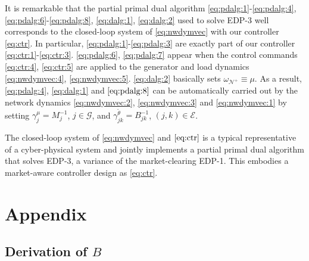 \documentclass[journal,12pt,onecolumn,draftclsnofoot]{IEEEtran}
\begin{document}
It is remarkable that the partial primal dual algorithm \eqref{eq:pdalg:1}-\eqref{eq:pdalg:4}, \eqref{eq:pdalg:6}-\eqref{eq:pdalg:8}, \eqref{eq:dalg:1}, \eqref{eq:dalg:2} used to solve EDP-3 well corresponds to the closed-loop system of \eqref{eq:nwdymvec} with our controller \eqref{eq:ctr}. In particular, \eqref{eq:pdalg:1}-\eqref{eq:pdalg:3} are exactly part of our controller \eqref{eq:ctr:1}-\eqref{eq:ctr:3}. \eqref{eq:pdalg:6}, \eqref{eq:pdalg:7} appear when the control commands \eqref{eq:ctr:4}, \eqref{eq:ctr:5} are applied to the generator and load dynamics \eqref{eq:nwdymvec:4}, \eqref{eq:nwdymvec:5}. \eqref{eq:dalg:2} basically sets $\omega_{\mathcal{N}^+} \equiv \mu$. As a result, \eqref{eq:pdalg:4}, \eqref{eq:dalg:1} and $\eqref{eq:pdalg:8}$ can be automatically carried out by the network dynamics \eqref{eq:nwdymvec:2}, \eqref{eq:nwdymvec:3} and \eqref{eq:nwdymvec:1} by setting $\gamma^\mu_j=M_j^{-1}$, $j\in\mathcal{G}$, and $\gamma^{\tilde{\theta}}_{jk}=B_{jk}^{-1}$, $(j,k)\in\mathcal{E}$.

The closed-loop system of \eqref{eq:nwdymvec} and $\eqref{eq:ctr}$ is a typical representative of a cyber-physical system and jointly implements a partial primal dual algorithm that solves EDP-3, a variance of the market-clearing EDP-1. This embodies a market-aware controller design as \eqref{eq:ctr}.  



















\newpage
\appendix
\section{Appendix}

\subsection{Derivation of $B$}
\end{document}
